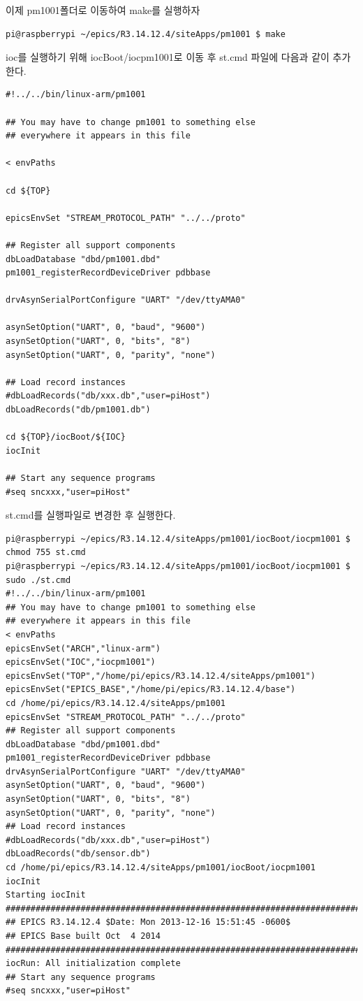\documentclass[11pt
  , a4paper
  , article
  , oneside
]{memoir}
\begin{document}
이제 pm1001폴더로 이동하여 make를 실행하자
\begin{lstlisting}[style=termstyle]
pi@raspberrypi ~/epics/R3.14.12.4/siteApps/pm1001 $ make
\end{lstlisting}
ioc를 실행하기 위해 iocBoot/iocpm1001로 이동 후 st.cmd 파일에 다음과 같이 추가 한다.
\begin{lstlisting}[style=termstyle]
#!../../bin/linux-arm/pm1001

## You may have to change pm1001 to something else
## everywhere it appears in this file

< envPaths

cd ${TOP}

epicsEnvSet "STREAM_PROTOCOL_PATH" "../../proto"

## Register all support components
dbLoadDatabase "dbd/pm1001.dbd"
pm1001_registerRecordDeviceDriver pdbbase

drvAsynSerialPortConfigure "UART" "/dev/ttyAMA0"

asynSetOption("UART", 0, "baud", "9600")
asynSetOption("UART", 0, "bits", "8")
asynSetOption("UART", 0, "parity", "none")

## Load record instances
#dbLoadRecords("db/xxx.db","user=piHost")
dbLoadRecords("db/pm1001.db")

cd ${TOP}/iocBoot/${IOC}
iocInit

## Start any sequence programs
#seq sncxxx,"user=piHost"
\end{lstlisting}
st.cmd를 실행파일로 변경한 후 실행한다.
\begin{lstlisting}[style=termstyle]
pi@raspberrypi ~/epics/R3.14.12.4/siteApps/pm1001/iocBoot/iocpm1001 $ chmod 755 st.cmd
pi@raspberrypi ~/epics/R3.14.12.4/siteApps/pm1001/iocBoot/iocpm1001 $ sudo ./st.cmd
#!../../bin/linux-arm/pm1001
## You may have to change pm1001 to something else
## everywhere it appears in this file
< envPaths
epicsEnvSet("ARCH","linux-arm")
epicsEnvSet("IOC","iocpm1001")
epicsEnvSet("TOP","/home/pi/epics/R3.14.12.4/siteApps/pm1001")
epicsEnvSet("EPICS_BASE","/home/pi/epics/R3.14.12.4/base")
cd /home/pi/epics/R3.14.12.4/siteApps/pm1001
epicsEnvSet "STREAM_PROTOCOL_PATH" "../../proto"
## Register all support components
dbLoadDatabase "dbd/pm1001.dbd"
pm1001_registerRecordDeviceDriver pdbbase
drvAsynSerialPortConfigure "UART" "/dev/ttyAMA0"
asynSetOption("UART", 0, "baud", "9600")
asynSetOption("UART", 0, "bits", "8")
asynSetOption("UART", 0, "parity", "none")
## Load record instances
#dbLoadRecords("db/xxx.db","user=piHost")
dbLoadRecords("db/sensor.db")
cd /home/pi/epics/R3.14.12.4/siteApps/pm1001/iocBoot/iocpm1001
iocInit
Starting iocInit
############################################################################
## EPICS R3.14.12.4 $Date: Mon 2013-12-16 15:51:45 -0600$
## EPICS Base built Oct  4 2014
############################################################################
iocRun: All initialization complete
## Start any sequence programs
#seq sncxxx,"user=piHost"
\end{lstlisting}
\end{document}
